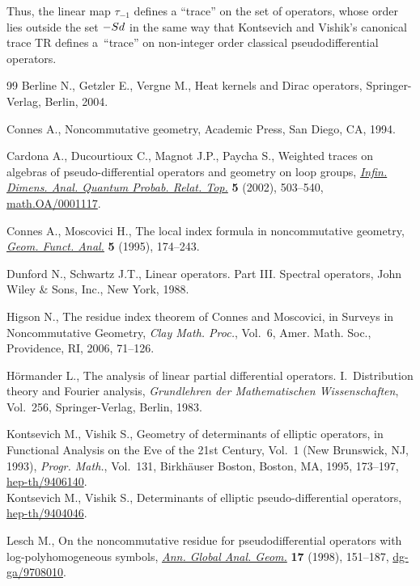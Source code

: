 \documentclass[11pt]{article}
\numberwithin{equation}{section}
\begin{document}
 Thus, the linear map $\tau_{-1}$ def\/ines a ``trace''  on the set of
operators, whose order  lies outside the set $-{\rm Sd}$  in the same way that
Kontsevich and Vishik's canonical trace TR
def\/ines a~``trace'' on non-integer order classical pseudodif\/ferential
operators.
\begin{thebibliography}{99}
Berline N., Getzler  E., Vergne M.,
Heat kernels and Dirac operators,
Springer-Verlag, Berlin, 2004.


Connes A.,
Noncommutative geometry,
Academic Press, San Diego, CA, 1994.


  Cardona  A.,  Ducourtioux C.,  Magnot J.P., Paycha  S.,
Weighted traces on algebras of pseudo-dif\/ferential operators and geometry on loop groups,
\href{http://dx.doi.org/10.1142/S021902570200095X}{{\it Infin. Dimens. Anal. Quantum Probab. Relat. Top.}} {\bf 5} (2002), 503--540,
\href{http://arxiv.org/abs/math.OA/0001117}{math.OA/0001117}.

 Connes A., Moscovici H.,
 The local index formula in noncommutative geometry,
 \href{http://dx.doi.org/10.1007/BF01895667}{{\it Geom. Funct. Anal.}} {\bf 5} (1995), 174--243.

Dunford N.,  Schwartz J.T.,
Linear operators. Part III. Spectral operators,
John Wiley \& Sons, Inc., New York, 1988.


Higson N.,
The residue index theorem of Connes and Moscovici,
in Surveys in Noncommutative Geometry, {\it Clay Math. Proc.}, Vol.~6, Amer. Math. Soc., Providence, RI, 2006, 71--126.


 H\"ormander L.,
 The analysis of linear partial dif\/ferential operators. I.~Distribution theory and Fourier ana\-ly\-sis,
 {\it Grundlehren der Mathematischen Wissenschaften}, Vol.~256, Springer-Verlag, Berlin, 1983.

Kontsevich M., Vishik  S.,
Geometry of determinants of elliptic operators,
in Functional Analysis on the Eve of the 21st Century, Vol.~1 (New Brunswick, NJ, 1993), {\it Progr. Math.}, Vol.~131, Birkh\"auser Boston, Boston, MA, 1995, 173--197,
\href{http://arxiv.org/abs/hep-th/9406140}{hep-th/9406140}.
\\
Kontsevich M., Vishik  S.,
Determinants of elliptic pseudo-dif\/ferential operators, %
\href{http://arxiv.org/abs/hep-th/9404046}{hep-th/9404046}.

Lesch M.,
On the noncommutative residue for pseudodif\/ferential operators with log-polyhomogeneous symbols,
\href{http://dx.doi.org/10.1023/A:1006504318696}{{\it Ann.  Global  Anal. Geom.}} {\bf 17} (1998),  151--187,
\href{http://arxiv.org/abs/dg-ga/9708010}{dg-ga/9708010}.


\end{thebibliography}
\end{document}
